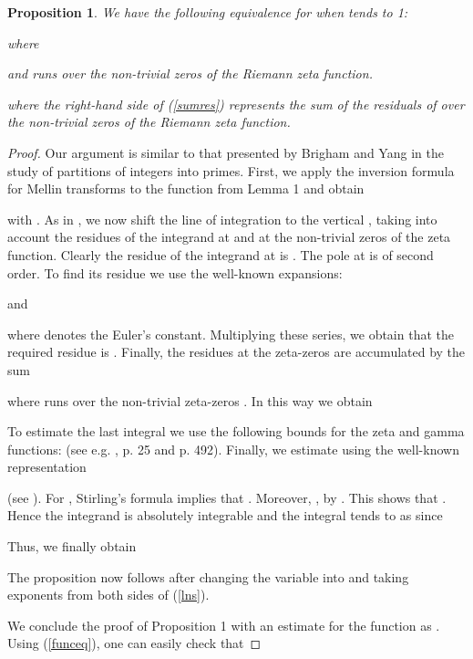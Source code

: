 \documentclass{article}
\newtheorem{proposition}[theorem]{Proposition}
\begin{document}
   \begin{proposition} \label{prop:equiv} We have the following equivalence for  when  tends to 1:
   
where
 
and  runs over the non-trivial zeros of the Riemann zeta
 function.

  
 where the right-hand side of (\ref{sumres}) represents the sum of the residuals
 of  over the non-trivial zeros of the Riemann zeta
 function.






\end{proposition}
\begin{proof}
 Our argument is similar to that presented by Brigham \cite{Brigham1950} and Yang \cite{Yang2000} in the study of partitions
 of integers into primes. First, we apply the inversion formula for Mellin
 transforms to the function from Lemma 1 and obtain
 
 with . As in \cite{Brigham1950,Yang2000}, we now shift the line of integration to the
 vertical , taking into account the residues
 of the integrand at  and at the non-trivial zeros of the zeta
 function. Clearly the residue of the integrand at  is
 . The pole at  is of second order. To
 find its residue we use the well-known expansions:
 
 
 
 
 and
 
 where  denotes the Euler's constant. Multiplying these series,
 we obtain that the required residue is
 .
 Finally, the residues at the zeta-zeros are accumulated by the
 sum
 
 where  runs over the non-trivial zeta-zeros
. In this way we obtain
 
 To estimate the last integral we use the following bounds for the
 zeta and gamma functions:  (see
 e.g. \cite{ivic2003}, p. 25 and p. 492). Finally, we estimate 
 using the well-known representation
 
  (see \cite[p.~9]{ivic2003}). For
 , Stirling's formula implies that
 . Moreover, , by \cite[Thm.\ 9.1, p.\ 235]{ivic2003}. This shows that
 .
 Hence the integrand is absolutely integrable and the integral tends to  as
  since
 
 Thus, we finally obtain
 
 The proposition now follows after changing the variable  into
  and taking exponents from both sides of (\ref{lns}).

 We conclude the proof of Proposition 1 with an estimate for the
 function  as . Using (\ref{funceq}), one can
 easily check that



\end{proof}
\end{document}
